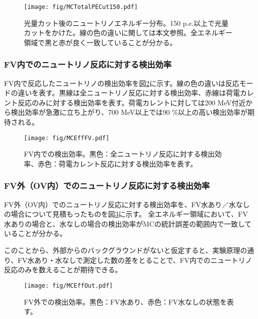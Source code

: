 \documentclass[11pt]{jreport}
\newcommand{\figref}[1]{図\ref{#1}}
\begin{document}
\begin{figure}[htbp]
\centering
\texttt{[image: fig/MCTotalPECut150.pdf]}
\caption[光量カット後のニュートリノエネルギー分布]{光量カット後のニュートリノエネルギー分布。150 p.e.以上で光量カットをかけた。線の色の違いに関しては本文参照。全エネルギー領域で黒と赤が良く一致していることが分かる。}
\label{MCTotalPECut}
\end{figure}

\subsubsection{FV内でのニュートリノ反応に対する検出効率}

FV内で反応したニュートリノの検出効率を\figref{MCEffFV}に示す。線の色の違いは反応モードの違いを表す。黒線は全ニュートリノ反応に対する検出効率、赤線は荷電カレント反応のみに対する検出効率を表す。荷電カレントに対しては200 MeV付近から検出効率が急激に立ち上がり、700 MeV以上では90 \%以上の高い検出効率が期待される。

\begin{figure}[htbp]
\centering
\texttt{[image: fig/MCEffFV.pdf]}
\caption[FV内での検出効率]{FV内での検出効率。黒色：全ニュートリノ反応に対する検出効率、赤色：荷電カレント反応に対する検出効率を表す。}
\label{MCEffFV}
\end{figure}

\newpage
\subsubsection{FV外（OV内）でのニュートリノ反応に対する検出効率}

FV外（OV内）でのニュートリノ反応に対する検出効率を、FV水あり／水なしの場合について見積もったものを\figref{MCEffOut}に示す。
全エネルギー領域において、FV水ありの場合と、水なしの場合の検出効率がMCの統計誤差の範囲内で一致していることが分かる。

このことから、外部からのバックグラウンドがないと仮定すると、実験原理の通り、FV水あり・水なしで測定した数の差をとることで、FV内でのニュートリノ反応のみを数えることが期待できる。

\begin{figure}[!h]
\centering
\texttt{[image: fig/MCEffOut.pdf]}
\caption[FV外での検出効率]{FV外での検出効率。黒色：FV水あり、赤色：FV水なしの状態を表す。}
\label{MCEffOut}
\end{figure}
\end{document}
